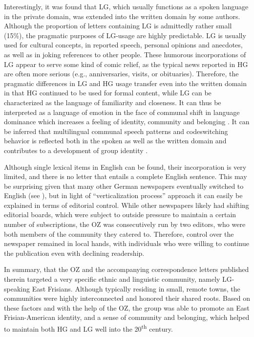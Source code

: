 \documentclass[output=paper]{langsci/langscibook}
\begin{document}
 
Interestingly, it was found that LG, which usually functions as a spoken language in the private domain, was extended into the written domain by some authors. Although the proportion of letters containing LG is admittedly rather small (15\%), the pragmatic purposes of LG-usage are highly predictable. LG is usually used for cultural concepts, in reported speech, personal opinions and anecdotes, as well as in joking references to other people. These humorous incorporations of LG appear to serve some kind of comic relief, as the typical news reported in HG are often more serious (e.g., anniversaries, visits, or obituaries). Therefore, the pragmatic differences in LG and HG usage transfer even into the written domain in that HG continued to be used for formal content, while LG can be characterized as the language of familiarity and closeness. It can thus be interpreted as a language of emotion in the face of communal shift in language dominance which increases a feeling of identity, community and belonging \citep{Pavlenko2002}. It can be inferred that multilingual communal speech patterns and codeswitching behavior is reflected both in the spoken as well as the written domain and contributes to a development of group identity .%
 

 
Although single lexical items in English can be found, their incorporation is very limited, and there is no letter that entails a complete English sentence. This may be surprising given that many other German newspapers eventually switched to English (see ), but in light of  ``verticalization process'' approach it can easily be explained in terms of editorial control. While other newspapers likely had shifting editorial boards, which were subject to outside pressure to maintain a certain number of subscriptions, the OZ was consecutively run by two editors, who were both members of the community they catered to. Therefore, control over the newspaper remained in local hands, with individuals who were willing to continue the publication even with declining readership. 
 
 
In summary, that the OZ and the accompanying correspondence letters published therein targeted a very specific ethnic and linguistic community, namely LG-speaking East Frisians. Although typically residing in small, remote towns, the communities were highly interconnected and honored their shared roots. Based on these factors and with the help of the OZ, the group was able to promote an East Frisian-American identity, and a sense of community and belonging, which helped to maintain both HG and LG well into the 20\textsuperscript{th} century. 
\end{document}
